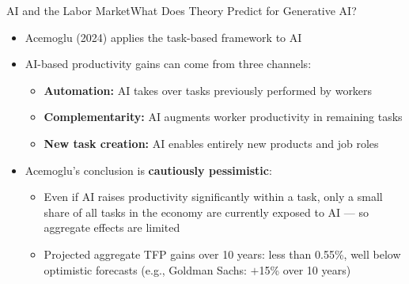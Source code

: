 \documentclass[hyperref={pdfpagelabels=false}]{beamer}
\begin{document}
\begin{frame}{AI and the Labor Market}{What Does Theory Predict for Generative AI?}
	\begin{itemize}
		\item Acemoglu (2024) applies the task-based framework to AI
		\vspace{0.2cm}
		\item AI-based productivity gains can come from three channels:
		\vspace{0.2cm}
		\begin{itemize}
			\item \textbf{Automation:} AI takes over tasks previously performed by workers
			\vspace{0.2cm}
			\item \textbf{Complementarity:} AI augments worker productivity in remaining tasks
			\vspace{0.2cm}
			\item \textbf{New task creation:} AI enables entirely new products and job roles
		\end{itemize}
		\vspace{0.3cm}
		\item Acemoglu's conclusion is \textbf{cautiously pessimistic}:
		\vspace{0.2cm}
		\begin{itemize}
			\item Even if AI raises productivity significantly within a task, only a small share of all tasks in the economy are currently exposed to AI --- so aggregate effects are limited
			\vspace{0.2cm}
			\item Projected aggregate TFP gains over 10 years: less than 0.55\%, well below optimistic forecasts (e.g., Goldman Sachs: $+$15\% over 10 years)
		\end{itemize}
	\end{itemize}
\end{frame}
\end{document}
